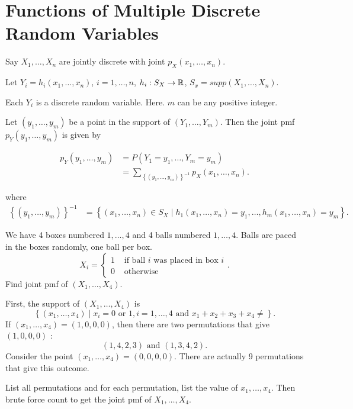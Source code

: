 
\section{Functions of Multiple Discrete Random Variables}

Say $X_{1} , \ldots , X_{n}$ are jointly discrete with joint $p_{X}\left( x_{1} , \ldots , x_{n} \right) $. 

Let $Y_{i} = h_{i}\left( x_{1} , \ldots , x_{n} \right)$, $  i = 1, \ldots, n $, $h_{i} : S_{X} \to \mathbb{R}$, $S_{x} = supp\left( X_{1} , \ldots , X_{n} \right) $. 

\begin{note}
	Each $Y_{i}$ is a discrete random variable. Here. $m$ can be any positive integer.
\end{note}	
Let $\left( y_{1} , \ldots , y_{m} \right) $ be a point in the support of $\left( Y_{1} , \ldots , Y_{m} \right) $. Then the joint pmf $p_{Y}\left( y_{1} , \ldots , y_{m} \right) $ is given by

\begin{align*}
	p_{Y}\left( y_{1} , \ldots , y_{m} \right) &= P\left( Y_1 = y_1, \ldots, Y_m = y_{m} \right)  \\
						   &= \sum_{\left\{ \left( y_{1} , \ldots , y_{m} \right)  \right\} ^{-1}}^{ } p_{X}\left( x_{1} , \ldots , x_{n} \right) 
.\end{align*}

where
\begin{align*}
	\left\{ \left( y_{1} , \ldots , y_{m} \right)  \right\} ^{-1} &= 
	\left\{ \left( x_{1} , \ldots , x_{n} \right)  \in  S_{X}  \mid h_1\left( x_{1} , \ldots , x_{n} \right) = y_1, \ldots, h_{m}\left( x_{1} , \ldots , x_{n} \right) = y_{m}\right\} 
.\end{align*}

\begin{eg}
	We have 4 boxes numbered $1, \ldots, 4$ and 4 balls numbered $1, \ldots, 4$. Balls are paced in the boxes randomly, one ball per box. 
	\[
	X_{i} = \begin{cases}
		1 & \text{ if ball } i \text{ was placed in box } i \\
		0 & \text{ otherwise}
	\end{cases}
	.\] 
	Find joint pmf of $\left( X_{1} , \ldots , X_{4} \right) $. 

	First, the support of $\left( X_{1} , \ldots , X_{4} \right) $ is 
	 \[
		 \left\{ \left( x_{1} , \ldots , x_{4} \right)   \mid x_{i} = 0 \text{ or } 1, i = 1, \ldots, 4 \text{ and } x_1 + x_2 + x_3 + x_4 \neq  \right\} 
	.\] 
	If $\left( x_{1} , \ldots , x_{4} \right) = \left( 1, 0,0,0 \right) $, then there are two permutations that give $\left( 1, 0, 0, 0 \right) $ :
	\[
		\left( 1, 4, 2, 3 \right) \text{ and } \left( 1, 3, 4, 2 \right) 
	.\] 
	Consider the point $\left( x_{1} , \ldots , x_{4} \right) = \left( 0,0,0,0 \right) $. There are actually 9 permutations that give this outcome.  

	List all permutations and for each permutation, list the value of $x_{1} , \ldots , x_{4}$. Then brute force count to get the joint pmf of $X_{1} , \ldots , X_{4}$.
\end{eg}

